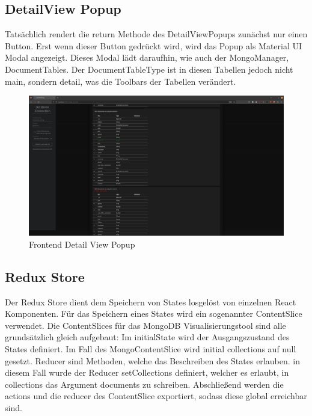 \subsection{DetailView Popup}
\label{sub:fe_detail_view}

Tatsächlich rendert die return Methode des DetailViewPopups zunächst nur einen Button. 
Erst wenn dieser Button gedrückt wird, wird das Popup als Material UI Modal angezeigt.
Dieses Modal lädt daraufhin, wie auch der MongoManager, DocumentTables.
Der DocumentTableType ist in diesen Tabellen jedoch nicht main, sondern detail, was die Toolbars der Tabellen verändert.


\begin{figure}[H]
    \includegraphics[width=\textwidth]{images/frontend_detail_view}
    \caption{Frontend Detail View Popup}
    \label{fig:frontend_detail_view}
\end{figure}

\subsection{Redux Store}
\label{sub:fe_redux}

Der Redux Store dient dem Speichern von States losgelöst von einzelnen React Komponenten.
Für das Speichern eines States wird ein sogenannter ContentSlice verwendet.
Die ContentSlices für das MongoDB Visualisierungstool sind alle grundsätzlich gleich aufgebaut:
Im initialState wird der Ausgangszustand des States definiert. 
Im Fall des MongoContentSlice wird initial collections auf null gesetzt.
Reducer sind Methoden, welche das Beschreiben des States erlauben.
in diesem Fall wurde der Reducer setCollections definiert, welcher es erlaubt, in collections das Argument documents zu schreiben.
Abschließend werden die actions und die reducer des ContentSlice exportiert, sodass diese global erreichbar sind.

